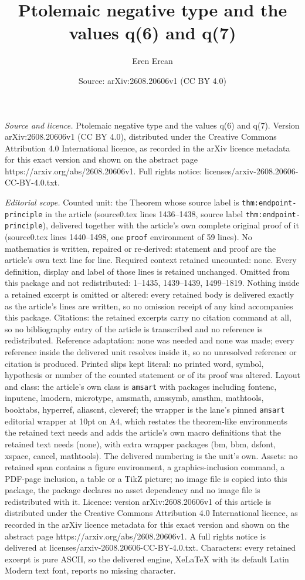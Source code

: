 \documentclass[10pt,a4paper]{amsart}
\title[Ptolemaic negative type and the values q(6) and q(7)]{Ptolemaic negative type and the values q(6) and q(7)}
\author{Eren Ercan}
\date{Source: arXiv:2608.20606v1 (CC BY 4.0)}
\begin{document}
\maketitle

\noindent\emph{Source and licence.} Ptolemaic negative type and the values q(6) and q(7). Version arXiv:2608.20606v1 (CC BY 4.0), distributed under the Creative Commons Attribution 4.0 International licence, as recorded in the arXiv licence metadata for this exact version and shown on the abstract page https://arxiv.org/abs/2608.20606v1. Full rights notice: licenses/arxiv-2608.20606-CC-BY-4.0.txt.\par\smallskip

\noindent\textit{Editorial scope.} Counted unit: the Theorem whose source label is \texttt{thm:endpoint-principle} in the article (source0.tex lines 1436--1438, source label \texttt{thm:endpoint-principle}), delivered together with the article's own complete original proof of it (source0.tex lines 1440--1498, one \texttt{proof} environment of 59 lines). No mathematics is written, repaired or re-derived: statement and proof are the article's own text line for line. Required context retained uncounted: none. Every definition, display and label of those lines is retained unchanged. Omitted from this package and not redistributed: 1--1435, 1439--1439, 1499--1819. Nothing inside a retained excerpt is omitted or altered: every retained body is delivered exactly as the article's lines are written, so no omission receipt of any kind accompanies this package. Citations: the retained excerpts carry no citation command at all, so no bibliography entry of the article is transcribed and no reference is redistributed. Reference adaptation: none was needed and none was made; every reference inside the delivered unit resolves inside it, so no unresolved reference or citation is produced. Printed slips kept literal: no printed word, symbol, hypothesis or number of the counted statement or of its proof was altered. Layout and class: the article's own class is \texttt{amsart} with packages including fontenc, inputenc, lmodern, microtype, amsmath, amssymb, amsthm, mathtools, booktabs, hyperref, aliascnt, cleveref; the wrapper is the lane's pinned \texttt{amsart} editorial wrapper at 10pt on A4, which restates the theorem-like environments the retained text needs and adds the article's own macro definitions that the retained text needs (none), with extra wrapper packages (bm, bbm, dsfont, xspace, cancel, mathtools). The delivered numbering is the unit's own. Assets: no retained span contains a figure environment, a graphics-inclusion command, a PDF-page inclusion, a table or a TikZ picture; no image file is copied into this package, the package declares no asset dependency and no image file is redistributed with it. Licence: version arXiv:2608.20606v1 of this article is distributed under the Creative Commons Attribution 4.0 International licence, as recorded in the arXiv licence metadata for this exact version and shown on the abstract page https://arxiv.org/abs/2608.20606v1. A full rights notice is delivered at licenses/arxiv-2608.20606-CC-BY-4.0.txt. Characters: every retained excerpt is pure ASCII, so the delivered engine, XeLaTeX with its default Latin Modern text font, reports no missing character.
\end{document}

